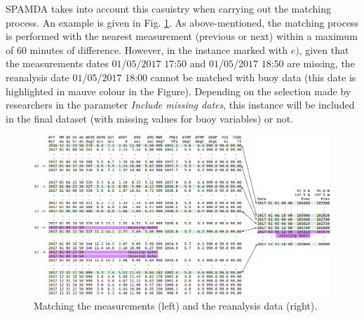 \documentclass[energies,article,submit,moreauthors,pdftex]{Definitions/mdpi}
\begin{document}
		SPAMDA takes into account this casuistry when carrying out the matching process. An example is given in Fig. \ref{fig:matchingMeasurements}. As above-mentioned, the matching process is performed with the nearest measurement (previous or next) within a maximum of 60 minutes of difference. However, in the instance marked with $e)$, given that the measurements dates $01$/$05$/$2017$ $17$:$50$ and $01$/$05$/$2017$ $18$:$50$ are missing, the reanalysis date $01$/$05$/$2017$ $18$:$00$ cannot be matched with buoy data (this date is highlighted in mauve colour in the Figure). Depending on the selection made by researchers in the parameter \textit{Include missing dates}, this instance will be included in the final dataset (with missing values for buoy variables) or not.
		
		\begin{figure}[ht!]
			\centering
			\includegraphics[scale=0.4]{figures/FigureMatchingMeasurements.png}
			\caption{Matching the measurements (left) and the reanalysis data (right).}
			\label{fig:matchingMeasurements}
		\end{figure}
		


%

\end{document}
